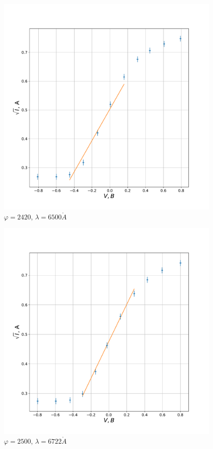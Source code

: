 \documentclass[a4paper, 12pt]{article}
\renewcommand{\phi}{\varphi}
\renewcommand{\AA}{\ensuremath{\mathring{A}}}
\begin{document}
\begin{figure}[H]
    \centering
    \includegraphics[scale=0.5]{2420}
    \caption {$\phi = 2420$, $\lambda = 6500 \AA$}
\end{figure}

\begin{figure}[H]
    \centering
    \includegraphics[scale=0.5]{2500}
    \caption {$\phi = 2500$, $\lambda = 6722 \AA$}
\end{figure}
\end{document}
